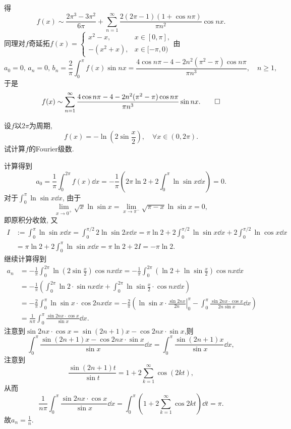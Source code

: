 \begin{quiza}
\begin{solution}
\begin{gather*}
\end{gather*}
得\[f(x)\sim\frac{2\pi^3-3\pi^2}{6\pi}+\sum_{n=1}^{\infty}\frac{2(2\pi-1)(1+\cos n\pi)}{\pi n^2}\cos nx.\]同理对\(f\)奇延拓\(f(x)=\begin{cases}
x^2-x,\, &x\in[0,\pi],\\-(x^2+x),& x\in[-\pi,0)
\end{cases}\)由\[a_0=0,\,a_n=0,\,b_n=\frac{2}{\pi}\int_{0}^{\pi}f(x)\sin nx=\frac{4\cos n\pi-4-2n^2(\pi^2-\pi)\cos n\pi}{\pi n^3},\quad n\geqslant 1,\]于是\[f(x)\sim\sum_{n=1}^{\infty}\frac{4\cos n\pi-4-2n^2(\pi^2-\pi)\cos n\pi}{\pi n^3}\sin nx.\qedhere\]
\end{solution}
\woe 设\(f\)以\(2\pi\)为周期,\[f(x)=-\ln\left(2\sin\frac{x}{2}\right),\quad\forall x\in\left(0,2\pi\right).\]试计算\(f\)的Fourier级数.
\begin{solution}
计算得到\[a_0=\frac{1}{\pi}\int_{0}^{2\pi}f(x)\dd x=-\frac{1}{\pi}\left(2\pi\ln 2+2\int_{0}^{\pi}\ln\sin x\dd x\right)=0.\]
对于\(\int_{0}^{\pi}\ln\sin x\dd x\), 由于\[\lim_{x\rightarrow0^+}\sqrt{x}\ln\sin x=\lim_{x\rightarrow\pi^-}\sqrt{\pi-x}\ln\sin x=0,\]即原积分收敛, 又\[\begin{split}
I&:=\int_{0}^{\pi}\ln\sin x\dd x=\int_{0}^{\pi/2}2\ln\sin 2x\dd x=\pi\ln 2+2\int_{0}^{\pi/2}\ln\sin x\dd x+2\int_{0}^{\pi/2}\ln\cos x\dd x\\&=\pi\ln 2+2\int_{0}^{\pi}\ln\sin x\dd x=\pi\ln2+2I=-\pi\ln2. 
\end{split}\]继续计算得到 \[\begin{split}
a_n&=-\frac{1}{\pi}\int_{0}^{2\pi}\ln\left(2\sin\frac{x}{2}\right)\cos nx\dd x=-\frac{1}{\pi}\int_{0}^{2\pi}\left(\ln 2+\ln\sin\frac{x}{2}\right)\cos nx\dd x\\
&=-\frac{1}{\pi}\left(\int_{0}^{2\pi}\ln 2\cdot\sin nx\dd x+\int_{0}^{2\pi}\ln\sin\frac{x}{2}\cdot\cos nx\dd x\right)\\
&=-\frac{2}{\pi}\int_{0}^{\pi}\ln\sin x\cdot\cos 2nx\dd x=-\frac{2}{\pi}\left(\left.\ln \sin x\cdot\frac{\sin 2n x}{2n}\right|_0^\pi-\int_{0}^{\pi}\frac{\sin 2nx\cdot\cos x}{2n\sin x}\dd x\right)\\&=\frac{1}{n\pi}\int_{0}^{\pi}\frac{\sin 2nx\cdot\cos x}{\sin x}\dd x.
\end{split}\]
注意到\(\sin 2nx\cdot\cos x=\sin(2n+1)x-\cos 2nx\cdot\sin x\),则\[\int_{0}^{\pi}\frac{\sin(2n+1)x-\cos 2nx\cdot\sin x}{\sin x}\dd x=\int_{0}^{\pi}\frac{\sin(2n+1)x}{\sin x}\dd x,\]注意到\[\frac{\sin(2n+1)t}{\sin t}=1+2\sum_{k=1}^{\infty}\cos(2kt),\]从而\[\frac{1}{n\pi}\int_{0}^{\pi}\frac{\sin 2nx\cdot\cos x}{\sin x}\dd x=\int_{0}^{\pi}\left(1+2\sum_{k=1}^{\infty}\cos 2kt\right)\dd t=\pi.\]故\(a_n=\frac{1}{n}\).

\end{solution}
\end{quiza}
